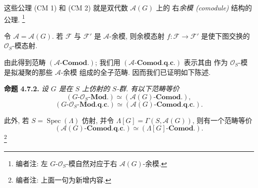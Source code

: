 这些公理 (CM 1) 和 (CM 2) 就是双代数 \(\mathscr A(G)\) 上的
右\emph{余模 (comodule)} 结构的公理.
\footnote{编者注: 左 \(G\)-\(\mathcal O_S\)-模自然对应于右
\(\mathscr A(G)\)-余模.}

令 \(\mathscr A=\mathscr A(G)\). 若 \(\mathscr F\) 与
\(\mathscr F'\) 是 \(\mathscr A\)-余模, 则余模态射
\(f:\mathscr F\to\mathscr F'\) 是使下图交换的
\(\mathcal O_S\)-模态射.


\begin{figure}[H]
  \centering
  
  \label{fig:sga3-exp1-p030-comodule-morphism-square}
\end{figure}

由此得到范畴 \((\mathscr A\text{-}\mathbf{Comod.})\);
我们用 \((\mathscr A\text{-}\mathbf{Comod.q.c.})\) 表示其由
作为 \(\mathcal O_S\)-模是拟凝聚的那些 \(\mathscr A\)-余模
组成的全子范畴. 因而我们已证明如下陈述.

\medskip
\noindent{}\textbf{命题 4.7.2.}
\textit{设 \(G\) 是在 \(S\) 上仿射的 \(S\)-群. 有以下范畴等价
\[
  (G\text{-}\mathcal O_S\text{-}\mathbf{Mod.})
    \simeq(\mathscr A(G)\text{-}\mathbf{Comod.}),
\]
\[
  (G\text{-}\mathcal O_S\text{-}\mathbf{Mod.q.c.})
    \simeq(\mathscr A(G)\text{-}\mathbf{Comod.q.c.}).
\]}

此外, 若 \(S=\operatorname{Spec}(\Lambda)\) 仿射, 并令
\(\Lambda[G]=\Gamma(S,\mathscr A(G))\), 则有一个范畴等价
\[
  (\mathscr A(G)\text{-}\mathbf{Comod.q.c.})
    \simeq(\Lambda[G]\text{-}\mathbf{Comod.}).
\]
\footnote{编者注: 上面一句为新增内容.}

